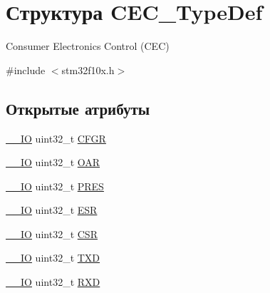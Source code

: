 \hypertarget{struct_c_e_c___type_def}{}\section{Структура C\+E\+C\+\_\+\+Type\+Def}
\label{struct_c_e_c___type_def}


Consumer Electronics Control (C\+EC)  




{\ttfamily \#include $<$stm32f10x.\+h$>$}

\subsection*{Открытые атрибуты}
\begin{DoxyCompactItemize}
\item 
\mbox{\hyperlink{group___c_m_s_i_s___c_m3__core__definitions_gaec43007d9998a0a0e01faede4133d6be}{\+\_\+\+\_\+\+IO}} uint32\+\_\+t \mbox{\hyperlink{struct_c_e_c___type_def_a91a55cd277c20e5c5ad228fd9013d014}{C\+F\+GR}}
\item 
\mbox{\hyperlink{group___c_m_s_i_s___c_m3__core__definitions_gaec43007d9998a0a0e01faede4133d6be}{\+\_\+\+\_\+\+IO}} uint32\+\_\+t \mbox{\hyperlink{struct_c_e_c___type_def_aa578935e8a0795a0a7494f4d281bc43d}{O\+AR}}
\item 
\mbox{\hyperlink{group___c_m_s_i_s___c_m3__core__definitions_gaec43007d9998a0a0e01faede4133d6be}{\+\_\+\+\_\+\+IO}} uint32\+\_\+t \mbox{\hyperlink{struct_c_e_c___type_def_a2e1d5865f3d49a195e58f265b425256e}{P\+R\+ES}}
\item 
\mbox{\hyperlink{group___c_m_s_i_s___c_m3__core__definitions_gaec43007d9998a0a0e01faede4133d6be}{\+\_\+\+\_\+\+IO}} uint32\+\_\+t \mbox{\hyperlink{struct_c_e_c___type_def_a90adcbf5ee626747170b2f208770628f}{E\+SR}}
\item 
\mbox{\hyperlink{group___c_m_s_i_s___c_m3__core__definitions_gaec43007d9998a0a0e01faede4133d6be}{\+\_\+\+\_\+\+IO}} uint32\+\_\+t \mbox{\hyperlink{struct_c_e_c___type_def_ad9aa13645f701c5457fbf51a9ecf7aa4}{C\+SR}}
\item 
\mbox{\hyperlink{group___c_m_s_i_s___c_m3__core__definitions_gaec43007d9998a0a0e01faede4133d6be}{\+\_\+\+\_\+\+IO}} uint32\+\_\+t \mbox{\hyperlink{struct_c_e_c___type_def_a462a952588fc45732d4545dbe79356da}{T\+XD}}
\item 
\mbox{\hyperlink{group___c_m_s_i_s___c_m3__core__definitions_gaec43007d9998a0a0e01faede4133d6be}{\+\_\+\+\_\+\+IO}} uint32\+\_\+t \mbox{\hyperlink{struct_c_e_c___type_def_a13d5b0e5228d5cca9f7c5d8533705d21}{R\+XD}}
\end{DoxyCompactItemize}


